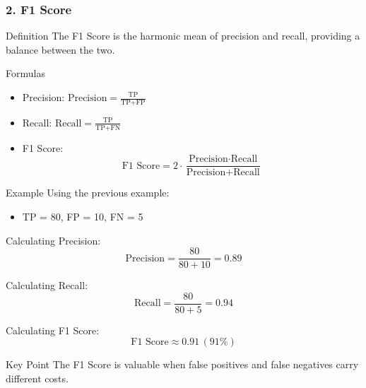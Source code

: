 \documentclass[aspectratio=169]{beamer}
\begin{document}
\begin{frame}[fragile]
    \frametitle{2. F1 Score}
    \begin{block}{Definition}
        The F1 Score is the harmonic mean of precision and recall, providing a balance between the two.
    \end{block}

    \begin{block}{Formulas}
        \begin{itemize}
            \item Precision: \(\text{Precision} = \frac{\text{TP}}{\text{TP} + \text{FP}}\)
            \item Recall: \(\text{Recall} = \frac{\text{TP}}{\text{TP} + \text{FN}}\)
            \item F1 Score: 
            \begin{equation}
                \text{F1 Score} = 2 \cdot \frac{\text{Precision} \cdot \text{Recall}}{\text{Precision} + \text{Recall}}
            \end{equation}
        \end{itemize}
    \end{block}
    
    \begin{block}{Example}
        Using the previous example:
        \begin{itemize}
            \item TP = 80, FP = 10, FN = 5
        \end{itemize}
        
        Calculating Precision:
        \begin{equation}
            \text{Precision} = \frac{80}{80 + 10} = 0.89
        \end{equation}
        
        Calculating Recall:
        \begin{equation}
            \text{Recall} = \frac{80}{80 + 5} = 0.94
        \end{equation}
        
        Calculating F1 Score:
        \begin{equation}
            \text{F1 Score} \approx 0.91 \, (91\%)
        \end{equation}
    \end{block}
    
    \begin{block}{Key Point}
        The F1 Score is valuable when false positives and false negatives carry different costs.
    \end{block}
\end{frame}
\end{document}
